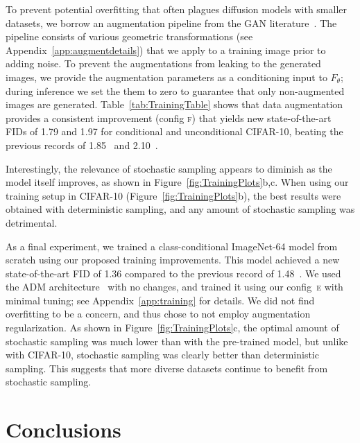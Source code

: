 \documentclass{article}
\begin{document}

To prevent potential overfitting that often plagues diffusion models with smaller datasets, we borrow an augmentation pipeline from the GAN literature~\cite{Karras2020ada}.
The pipeline consists of various geometric transformations (see Appendix~{\ref{app:augmentdetails}}) that we apply to a training image prior to adding noise.
To prevent the augmentations from leaking to the generated images, we provide the augmentation parameters as a conditioning input to $F_\theta$;
  during inference we set the them to zero to guarantee that only non-augmented images are generated.
Table~\ref{tab:TrainingTable} shows that data augmentation provides a consistent improvement (config \textsc{f}) that yields new state-of-the-art
  FIDs of 1.79 and 1.97 for conditional and unconditional CIFAR-10, beating the previous records of 1.85~\cite{Sauer2022} and 2.10~\cite{Vahdat2021}.


\figTrainingPlots

{
Interestingly, the relevance of stochastic sampling appears to diminish as the model itself improves, as shown in Figure~\ref{fig:TrainingPlots}b,c.
When using our training setup in CIFAR-10 (Figure~\ref{fig:TrainingPlots}b), the best results were obtained with deterministic sampling, and any amount of stochastic sampling was detrimental.%
}


{
As a final experiment, we trained a class-conditional ImageNet-64 model from scratch using our proposed training improvements.
This model achieved a new state-of-the-art FID of 1.36 compared to the previous record of 1.48~\cite{Ho2021cascaded}.
We used the ADM architecture~\cite{Dhariwal2021} with no changes, and trained it using our config~\textsc{e} with minimal tuning; see Appendix~\ref{app:training} for details.
We did not find overfitting to be a concern, and thus chose to not employ augmentation regularization.
As shown in Figure~\ref{fig:TrainingPlots}c, the optimal amount of stochastic sampling was much lower than with the pre-trained model, but unlike with CIFAR-10, stochastic sampling was clearly better than deterministic sampling.
This suggests that more diverse datasets continue to benefit from stochastic sampling.%
}

\vspace*{-1mm}
\section{Conclusions}
\label{sec:conclusions}
\end{document}
